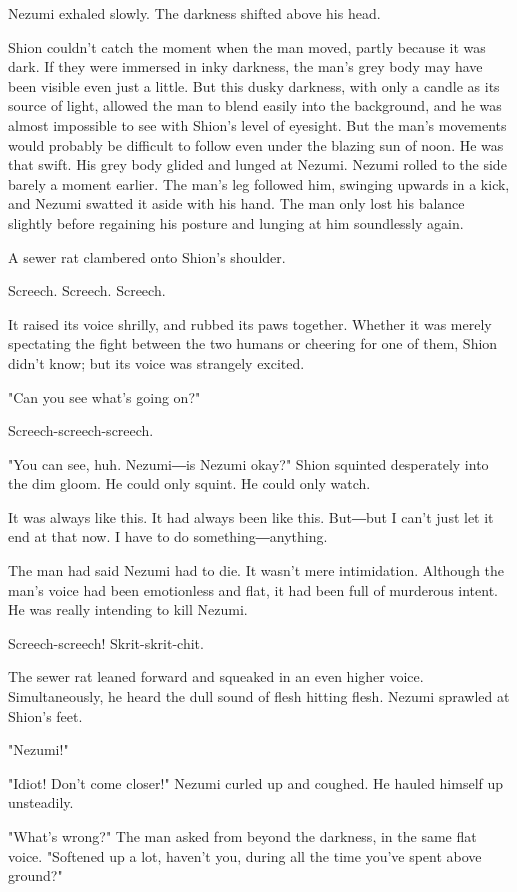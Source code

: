 Nezumi exhaled slowly. The darkness shifted above his head.

Shion couldn't catch the moment when the man moved, partly because it
was dark. If they were immersed in inky darkness, the man's grey body
may have been visible even just a little. But this dusky darkness, with
only a candle as its source of light, allowed the man to blend easily
into the background, and he was almost impossible to see with Shion's
level of eyesight. But the man's movements would probably be difficult
to follow even under the blazing sun of noon. He was that swift. His
grey body glided and lunged at Nezumi. Nezumi rolled to the side barely
a moment earlier. The man's leg followed him, swinging upwards in a
kick, and Nezumi swatted it aside with his hand. The man only lost his
balance slightly before regaining his posture and lunging at him
soundlessly again.

A sewer rat clambered onto Shion's shoulder.

Screech. Screech. Screech.

It raised its voice shrilly, and rubbed its paws together. Whether it
was merely spectating the fight between the two humans or cheering for
one of them, Shion didn't know; but its voice was strangely excited.

"Can you see what's going on?"

Screech-screech-screech.

"You can see, huh. Nezumi―is Nezumi okay?" Shion squinted desperately
into the dim gloom. He could only squint. He could only watch.

It was always like this. It had always been like this. But―but I can't
just let it end at that now. I have to do something―anything.

The man had said Nezumi had to die. It wasn't mere intimidation.
Although the man's voice had been emotionless and flat, it had been full
of murderous intent. He was really intending to kill Nezumi.

Screech-screech! Skrit-skrit-chit.

The sewer rat leaned forward and squeaked in an even higher voice.
Simultaneously, he heard the dull sound of flesh hitting flesh. Nezumi
sprawled at Shion's feet.

"Nezumi!"

"Idiot! Don't come closer!" Nezumi curled up and coughed. He hauled
himself up unsteadily.

"What's wrong?" The man asked from beyond the darkness, in the same flat
voice. "Softened up a lot, haven't you, during all the time you've spent
above ground?"

